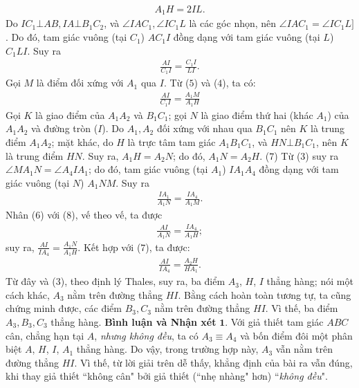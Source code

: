 \begin{multicols}{2}
	\begin{align*}
		A_1H = 2IL. \tag{$4$}
	\end{align*}
	Do  $IC_1 \bot AB, IA \bot B_1C_2$, và  $\angle IAC_1, \angle IC_1L$ là các góc nhọn, nên $\angle IAC_1 = \angle IC_1L]$. Do đó, tam giác vuông (tại  $C_1$) $AC_1I$   đồng dạng với tam giác vuông (tại $L$) $C_1LI$.  Suy ra
	\begin{align*}
		\frac{{AI}}{{{C_1}I}} = \frac{{{C_1}I}}{{LI}}.\tag{$5$}
	\end{align*}
	Gọi $M$ là điểm đối xứng với $A_1$  qua $I$. Từ ($5$) và ($4$), ta có:
	\begin{align*}
		\frac{{AI}}{{{C_1}I}} = \frac{{{A_1}M}}{{{A_1}H}} \tag{$6$}
	\end{align*}
	Gọi $K$ là giao điểm của $A_1A_2$ và  $B_1C_1$; gọi $N$ là giao điểm thứ hai (khác $A_1$) của  $A_1A_2$ và đường tròn ($I$).
	\vskip 0.05cm
	Do $A_1, A_2$  đối xứng với nhau qua  $B_1C_1$ nên $K$ là trung điểm $A_1A_2$;  mặt khác, do $H$ là trực tâm tam giác $A_1B_1C_1$, và  $HN \bot B_1C_1$, nên $K$ là trung điểm $HN$. Suy ra, $A_1H = A_2N$; do đó, $A_1N = A_2H$. \hfill  ($7$)
	\vskip 0.05cm
	Từ ($3$) suy ra  $\angle MA_1N = \angle A_4IA_1$; do đó, tam giác vuông (tại  $A_1$) $IA_1A_4$ đồng dạng với tam giác vuông (tại $N$) $A_1NM$.  Suy ra
	\begin{align*}
		\frac{{I{A_1}}}{{{A_1}N}} = \frac{{I{A_4}}}{{{A_1}M}}. \tag{$8$}
	\end{align*}
	Nhân ($6$) với ($8$), vế theo vế, ta được
	\begin{align*}
		\frac{{AI}}{{{A_1}N}} = \frac{{I{A_4}}}{{{A_1}H}};
	\end{align*}
	suy ra,  $\frac{{AI}}{{I{A_4}}} = \frac{{{A_1}N}}{{{A_1}H}}$. Kết hợp với ($7$), ta được:
	\begin{align*}
		\frac{{AI}}{{I{A_4}}} = \frac{{{A_2}H}}{{H{A_1}}}.
	\end{align*}
	Từ đây và ($3$), theo định lý Thales, suy ra, ba điểm  $A_3$, $H$, $I$ thẳng hàng; nói một cách khác, $A_3$  nằm trên đường thẳng $HI$.
	\vskip 0.05cm
	Bằng cách hoàn toàn tương tự, ta cũng chứng minh được, các điểm $B_3, C_3$  nằm trên đường thẳng $HI$. Vì thế, ba điểm  $A_3, B_3 ,C_3$  thẳng hàng.
	\vskip 0.05cm
	\textbf{\color{thachthuctoanhoc}Bình luận và Nhận xét}
	\vskip 0.05cm
	$\pmb{1.}$ Với giả thiết tam giác $ABC$ cân, chẳng hạn tại $A$, \textit{nhưng không đều}, ta có  $A_3 \equiv A_4$ và bốn điểm đôi một phân biệt $A$, $H$, $I$, $A_1$  thẳng hàng. Do vậy, trong trường hợp này,  $A_3$ vẫn nằm trên đường thẳng $HI$. Vì thế, từ lời giải trên dễ thấy, khẳng định của bài ra vẫn đúng, khi thay giả thiết ``không cân" bởi giả thiết (``nhẹ nhàng" hơn) ``\textit{không đều}".

\end{multicols}
